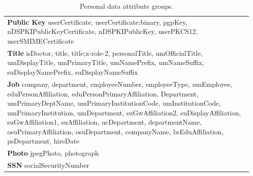 \begin{table}[!htb]
\begin{tabularx}{\linewidth}{@{} X @{}}
        \textbf{Public Key}  userCertificate, userCertificate;binary, pgpKey, nDSPKIPublicKeyCertificate, nDSPKIPublicKey, userPKCS12, userSMIMECertificate \\
        \textbf{Title}   isDoctor, title, title;x-role-2, personalTitle, umOfficialTitle, umDisplayTitle, umPrimaryTitle, umNamePrefix, umNameSuffix, suDisplayNamePrefix, suDisplayNameSuffix \\
        \textbf{Job}  company, department, employeeNumber, employeeType, umEmployee, eduPersonAffiliation, eduPersonPrimaryAffiliation, Department, umPrimaryDeptName, umPrimaryInstitutionCode, umInstitutionCode, umPrimaryInstitution, umDepartment, suGwAffiliation2, suDisplayAffiliation, suGwAffiliation1, suAffiliation, ucDepartment, departmentName, osuPrimaryAffiliation, osuDepartment, companyName, brEduAffiliation, psDepartment, hireDate \\
        \textbf{Photo}  jpegPhoto, photograph \\
        \textbf{SSN}  socialSecurityNumber \\
    \bottomrule
    \end{tabularx}
\caption{Personal data attribute groups.}
\label{tab:personal_data_attribute_groups}
\end{table}

